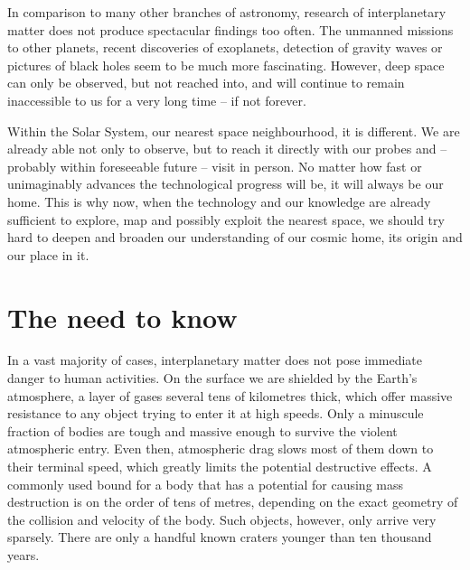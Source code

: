 
In comparison to many other branches of astronomy, research of interplanetary matter
does not produce spectacular findings too often.
The unmanned missions to other planets, recent discoveries of exoplanets, detection of gravity waves
or pictures of black holes seem to be much more fascinating.
However, deep space can only be observed, but not reached into, and will continue to remain
inaccessible to us for a very long time -- if not forever.

Within the Solar System, our nearest space neighbourhood, it is different. We are already able not only to observe,
but to reach it directly with our probes and -- probably within foreseeable future -- visit in person.
No matter how fast or unimaginably advances the technological progress will be, it will always be our home.
This is why now, when the technology and our knowledge are already sufficient to explore, map and possibly exploit
the nearest space, we should try hard to deepen and broaden our understanding of our cosmic home, its origin and our place in it.

\section{The need to know} \label{in}
    In a vast majority of cases, interplanetary matter does not pose immediate danger to human activities.
    On the surface we are shielded by the Earth's atmosphere, a layer of gases several tens of kilometres
    thick, which offer massive resistance to any object trying to enter it at high speeds.
    Only a minuscule fraction of bodies are tough and massive enough to survive the violent atmospheric entry.
    Even then, atmospheric drag slows most of them down to their terminal speed, which greatly limits the potential destructive effects.
    A commonly used bound for a body that has a potential for causing mass destruction is on the order of tens of metres,
    depending on the exact geometry of the collision and velocity of the body. Such objects, however, only arrive very sparsely.
    There are only a handful known craters younger than ten thousand years.

